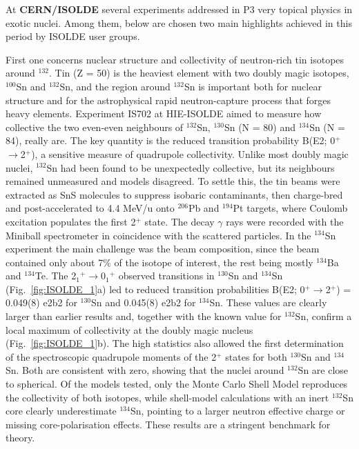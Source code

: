 At \textbf{CERN/ISOLDE} several experiments addressed  in P3 very topical physics in exotic nuclei. Among them, below are chosen two main highlights achieved  in this period by ISOLDE user groups.

First one concerns nuclear structure and collectivity of neutron-rich tin isotopes around $^{132}$.
Tin (Z = 50) is the heaviest element with two doubly magic isotopes, $^{100}$Sn and $^{132}$Sn, and the region around $^{132}$Sn is important both for nuclear structure and for the astrophysical rapid neutron-capture process that forges heavy elements. Experiment IS702 at HIE-ISOLDE aimed to measure how collective the two even-even neighbours of $^{132}$Sn, $^{130}$Sn (N = 80) and $^{134}$Sn (N = 84), really are. The key quantity is the reduced transition probability B(E2; 0$^+$$\rightarrow$2$^+$), a sensitive measure of quadrupole collectivity. Unlike most doubly magic nuclei, $^{132}$Sn had been found to be unexpectedly collective, but its neighbours remained unmeasured and models disagreed. To settle this, the tin beams were extracted as SnS molecules to suppress isobaric contaminants, then charge-bred and post-accelerated to 4.4 MeV/u onto $^{206}$Pb and $^{194}$Pt targets, where Coulomb excitation populates the first 2$^+$ state. The decay $\gamma$ rays were recorded with the Miniball spectrometer in coincidence with the scattered 
particles. In the $^{134}$Sn experiment the main challenge was the beam composition, since the beam contained only about 7$\%$ of the isotope of interest, the rest being mostly $^{134}$Ba and $^{134}$Te.
The 2$_{1}$$^{+}$$\rightarrow$0$_{1}$$^{+}$ observed transitions in $^{130}$Sn and $^{134}$Sn (Fig.~\ref{fig:ISOLDE_1}a) led to reduced transition probabilities B(E2; 0$^{+}$$\rightarrow$2$^{+}$) = 0.049(8) e2b2 for $^{130}$Sn and 0.045(8) e2b2 for $^{134}$Sn. These values are clearly larger than earlier results and, together with the 
known value for $^{132}$Sn, confirm a local maximum of collectivity at the doubly magic nucleus (Fig.~\ref{fig:ISOLDE_1}b). The high statistics also allowed the first determination of the spectroscopic quadrupole moments of the 2$^{+}$ states for both $^{130}$Sn and $^{134}$Sn. Both are consistent with zero, showing that the nuclei around $^{132}$Sn are close to spherical. Of the models tested, only the Monte Carlo Shell Model reproduces the collectivity of both isotopes, while shell-model calculations with an inert $^{132}$Sn core clearly underestimate $^{134}$Sn, pointing to a larger neutron effective charge or missing core-polarisation effects. These results are a stringent benchmark for theory.

